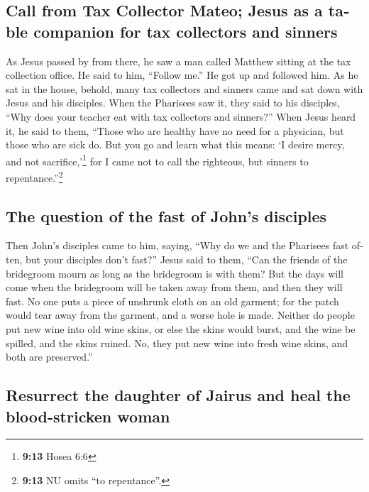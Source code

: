 \begin{paracol}{2}
\begin{otherlanguage}{english}
\hypertarget{call-from-tax-collector-mateo-jesus-as-a-table-companion-for-tax-collectors-and-sinners}{%
\subsection{Call from Tax Collector Mateo; Jesus as a table companion
for tax collectors and
sinners}\label{call-from-tax-collector-mateo-jesus-as-a-table-companion-for-tax-collectors-and-sinners}}

 As Jesus passed by from there, he saw a man called
Matthew sitting at the tax collection office. He said to him, ``Follow
me.'' He got up and followed him.  As he sat in the
house, behold, many tax collectors and sinners came and sat down with
Jesus and his disciples.  When the Pharisees saw it, they
said to his disciples, ``Why does your teacher eat with tax collectors
and sinners?''  When Jesus heard it, he said to them,
``Those who are healthy have no need for a physician, but those who are
sick do.  But you go and learn what this means: `I desire
mercy, and not sacrifice,'\footnote{\textbf{9:13} Hosea 6:6} for I came
not to call the righteous, but sinners to repentance.''\footnote{\textbf{9:13}
  NU omits ``to repentance''.}

\hypertarget{the-question-of-the-fast-of-johns-disciples}{%
\subsection{The question of the fast of John's
disciples}\label{the-question-of-the-fast-of-johns-disciples}}

 Then John's disciples came to him, saying, ``Why do we
and the Pharisees fast often, but your disciples don't fast?''
 Jesus said to them, ``Can the friends of the bridegroom
mourn as long as the bridegroom is with them? But the days will come
when the bridegroom will be taken away from them, and then they will
fast.  No one puts a piece of unshrunk cloth on an old
garment; for the patch would tear away from the garment, and a worse
hole is made.  Neither do people put new wine into old
wine skins, or else the skins would burst, and the wine be spilled, and
the skins ruined. No, they put new wine into fresh wine skins, and both
are preserved.''

\hypertarget{resurrect-the-daughter-of-jairus-and-heal-the-blood-stricken-woman}{%
\subsection{Resurrect the daughter of Jairus and heal the blood-stricken
woman}\label{resurrect-the-daughter-of-jairus-and-heal-the-blood-stricken-woman}}


\end{otherlanguage}
\end{paracol}
